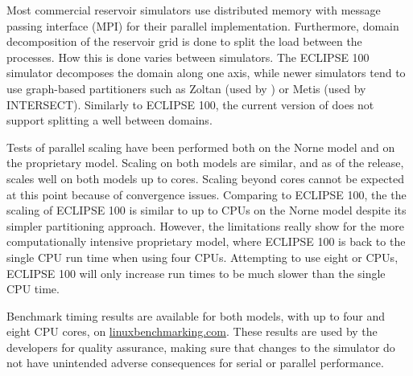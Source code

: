 Most commercial reservoir simulators use distributed memory with
message passing interface (MPI) for their parallel
implementation. Furthermore, domain decomposition of the reservoir
grid is done to split the load between the processes. How this is done
varies between simulators. The ECLIPSE 100 simulator decomposes the
domain along one axis, while newer simulators tend to use graph-based
partitioners such as Zoltan (used by \opmflow) or Metis (used by
INTERSECT). Similarly to ECLIPSE 100, the current version of \opmflow
does not support splitting a well between domains.

Tests of parallel scaling have been performed both on the Norne model
and on the proprietary model.  Scaling on both models are similar, and
as of the \opmversion release, \opmflow scales well on both models up
to {} cores. Scaling beyond {} cores cannot be expected at
this point because of convergence issues. Comparing to ECLIPSE 100,
the the scaling of ECLIPSE 100 is similar to \opmflow up to {}
CPUs on the Norne model despite its simpler partitioning
approach. However, the limitations really show for the more
computationally intensive proprietary model, where ECLIPSE 100 is back
to the single CPU run time when using four CPUs. Attempting to use
eight or {} CPUs, ECLIPSE 100 will only increase run times to be
much slower than the single CPU time.

Benchmark timing results are available for both models, with up to
four and eight CPU cores, on
\href{http://linuxbenchmarking.com}{linuxbenchmarking.com}. These
results are used by the developers for quality assurance, making sure
that changes to the simulator do not have unintended adverse
consequences for serial or parallel performance.


